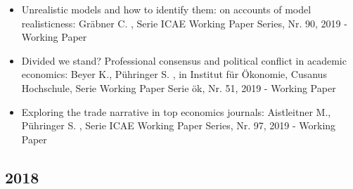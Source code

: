 \begin{itemize}
	 \item Unrealistic models and how to identify them: on accounts of model realisticness: Gräbner C. , Serie ICAE Working Paper Series, Nr. 90, 2019 - Working Paper
	 \item Divided we stand? Professional consensus and political conflict in academic economics: Beyer K., Pühringer S. , in Institut für Ökonomie, Cusanus Hochschule, Serie Working Paper Serie ök, Nr. 51, 2019 - Working Paper
	 \item Exploring the trade narrative in top economics journals: Aistleitner M., Pühringer S. , Serie ICAE Working Paper Series, Nr. 97, 2019 - Working Paper
\end{itemize} 
 \subsection{2018} 
